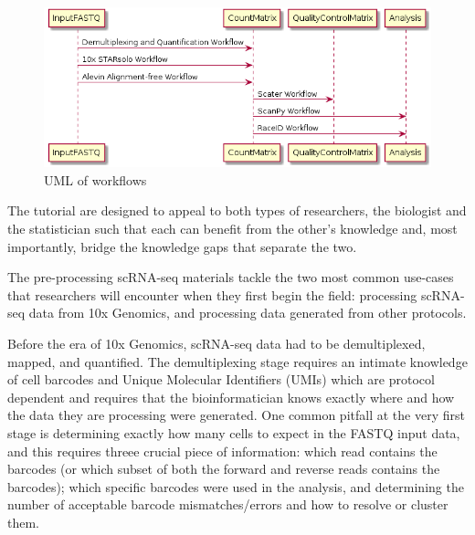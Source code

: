 \documentclass[a4paper,num-refs]{oup-contemporary}
\begin{document}

\begin{figure}[bt!] %
\centering
\includegraphics[width=\linewidth]{workflows}
\caption{UML of workflows}\label{fig:example}
\end{figure}


The tutorial are designed to appeal to both types of researchers, the biologist and the statistician such that each can benefit from the other's knowledge and, most importantly, bridge the knowledge gaps that separate the two.

The pre-processing scRNA-seq materials tackle the two most common use-cases that researchers will encounter when they first begin the field: processing scRNA-seq data from 10x Genomics, and processing data generated from other protocols.

Before the era of 10x Genomics, scRNA-seq data had to be demultiplexed, mapped, and quantified. The demultiplexing stage requires an intimate knowledge of cell barcodes and Unique Molecular Identifiers (UMIs) which are protocol dependent and requires that the bioinformatician knows exactly where and how the data they are processing were generated. One common pitfall at the very first stage is determining exactly how many cells to expect in the FASTQ input data, and this requires threee crucial piece of information: which read contains the barcodes (or which subset of both the forward and reverse reads contains the barcodes); which specific barcodes were used in the analysis, and determining the number of acceptable barcode mismatches/errors and how to resolve or cluster them.
\end{document}
